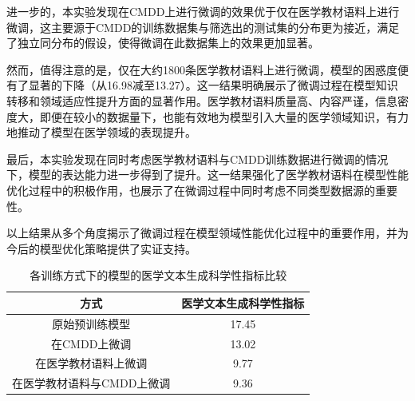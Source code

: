 进一步的，本实验发现在CMDD上进行微调的效果优于仅在医学教材语料上进行微调，这主要源于CMDD的训练数据集与筛选出的测试集的分布更为接近，满足了独立同分布的假设，使得微调在此数据集上的效果更加显著。

然而，值得注意的是，仅在大约1800条医学教材语料上进行微调，模型的困惑度便有了显著的下降（从16.98减至13.27）。这一结果明确展示了微调过程在模型知识转移和领域适应性提升方面的显著作用。医学教材语料质量高、内容严谨，信息密度大，即便在较小的数据量下，也能有效地为模型引入大量的医学领域知识，有力地推动了模型在医学领域的表现提升。

最后，本实验发现在同时考虑医学教材语料与CMDD训练数据进行微调的情况下，模型的表达能力进一步得到了提升。这一结果强化了医学教材语料在模型性能优化过程中的积极作用，也展示了在微调过程中同时考虑不同类型数据源的重要性。

以上结果从多个角度揭示了微调过程在模型领域性能优化过程中的重要作用，并为今后的模型优化策略提供了实证支持。

\begin{table}[]
	\centering
	\caption{各训练方式下的模型的医学文本生成科学性指标比较}
	\begin{tabular}{|c|c|}
		\hline
		方式&医学文本生成科学性指标   \\ \hline
		原始预训练模型&17.45    \\ \hline
		在CMDD上微调&13.02    \\ \hline
		在医学教材语料上微调&9.77    \\ \hline
		在医学教材语料与CMDD上微调&9.36   \\ \hline
	\end{tabular}
	\label{Chap5_MedTerm_Performance}
\end{table}


